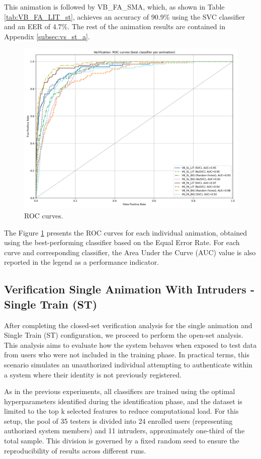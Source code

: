 \documentclass[12pt]{report}
\begin{document}
This animation is followed by VB\_FA\_SMA, which, as shown in Table \ref{tab:VB_FA_LIT_st}, achieves an accuracy of 90.9\% using the SVC classifier and an EER of 4.7\%.
The rest of the animation results are contained in Appendix \ref{subsec:vs_st_a}.

\begin{figure}[ht]
    \centering
    \includegraphics[width = 0.6
    \textwidth]{Images/Results/Verification_single/st/best_animation_roc_curves_st.png}
    \caption{ROC curves.}
    \label{fig:roc_st}
\end{figure}

The Figure \ref{fig:roc_st} presents the ROC curves for each individual animation, obtained using the best-performing classifier based on the Equal Error Rate.
For each curve and corresponding classifier, the Area Under the Curve (AUC) value is also reported in the legend as a performance indicator.
\FloatBarrier

\subsection{Verification Single Animation With Intruders - Single Train (ST)}
\label{subsec:vsi}

After completing the closed-set verification analysis for the single animation and Single Train (ST) configuration, we proceed to perform the open-set analysis.
This analysis aims to evaluate how the system behaves when exposed to test data from users who were not included in the training phase.
In practical terms, this scenario simulates an unauthorized individual attempting to authenticate within a system where their identity is not previously registered.

As in the previous experiments, all classifiers are trained using the optimal hyperparameters identified during the identification phase, and the dataset is limited to the top k selected features to reduce computational load.
For this setup, the pool of 35 testers is divided into 24 enrolled users (representing authorized system members) and 11 intruders, approximately one-third of the total sample.
This division is governed by a fixed random seed to ensure the reproducibility of results across different runs.
\end{document}
